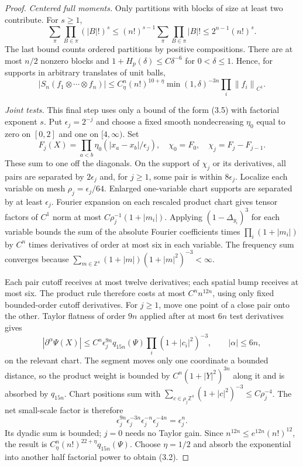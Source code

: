 \documentclass[11pt]{article}
\theoremstyle{remark}
\newcommand{\norm}[1]{\left\|#1\right\|}
\begin{document}
\begin{proof}
\emph{Centered full moments.}
Only partitions with blocks of size at least two contribute. For $s\geq1$,
\[
 \sum_{\pi}\prod_{B\in\pi}(|B|!)^s
 \leq(n!)^{s-1}\sum_{\pi}\prod_{B\in\pi}|B|!
 \leq2^{n-1}(n!)^s.
\]
The last bound counts ordered partitions by positive compositions.
There are at most $n/2$ nonzero blocks and
$1+H_p(\delta)\leq C\delta^{-6}$ for $0<\delta\leq1$.
Hence, for supports in arbitrary translates of unit balls,
\[
 |S_n(f_1\otimes\cdots\otimes f_n)|
 \leq C_\eta^n(n!)^{10+\eta}\min(1,\delta)^{-3n}
                       \prod_i\norm{f_i}_{C^1}.
 \tag{3.5}
\]

\emph{Joint tests.}
This final step uses only a bound of the form (3.5) with factorial
exponent $s$. Put $\epsilon_j=2^{-j}$ and choose a fixed smooth
nondecreasing $\eta_0$ equal to zero on $[0,2]$ and one on $[4,\infty)$.
Set
\[
 F_j(X)=\prod_{a<b}\eta_0(|x_a-x_b|/\epsilon_j),\quad
 \chi_0=F_0,\quad\chi_j=F_j-F_{j-1}.
\]
These sum to one off the diagonals. On the support of $\chi_j$ or its
derivatives, all pairs are separated by $2\epsilon_j$ and, for $j\geq1$,
some pair is within $8\epsilon_j$.
Localize each variable on mesh $\rho_j=\epsilon_j/64$.
Enlarged one-variable chart supports are separated by at least
$\epsilon_j$. Fourier expansion on each rescaled product chart gives
tensor factors of $C^1$ norm at most
$C\rho_j^{-1}(1+|m_i|)$.
Applying $(1-\Delta_{y_i})^3$ for each variable bounds the sum of
the absolute Fourier coefficients times $\prod_i(1+|m_i|)$ by
$C^n$ times derivatives of order at most six in each variable.
The frequency sum converges because
$\sum_{m\in\mathbb Z^4}(1+|m|)(1+|m|^2)^{-3}<\infty$.

Each pair cutoff receives at most twelve derivatives; each spatial
bump receives at most six. The product rule therefore costs at most
$C^n n^{12n}$, using only fixed bounded-order cutoff derivatives.
For $j\geq1$, move one point of a close pair onto the other.
Taylor flatness of order $9n$ applied after at most $6n$ test
derivatives gives
\[
 |\partial^\alpha\Psi(X)|
 \leq C^n\epsilon_j^{9n}q_{15n}(\Psi)
                        \prod_i(1+|c_i|^2)^{-3},
 \qquad |\alpha|\leq6n,
\]
on the relevant chart. The segment moves only one coordinate a bounded
distance, so the product weight is bounded by
$C^n(1+|Y|^2)^{3n}$ along it and is absorbed by $q_{15n}$.
Chart positions sum with
$\sum_{c\in\rho_j\mathbb Z^4}(1+|c|^2)^{-3}\leq C\rho_j^{-4}$.
The net small-scale factor is therefore
\[
 \epsilon_j^{9n}\epsilon_j^{-3n}
 \epsilon_j^{-n}\epsilon_j^{-4n}=\epsilon_j^n.
\]
Its dyadic sum is bounded; $j=0$ needs no Taylor gain. Since
$n^{12n}\leq e^{12n}(n!)^{12}$, the result is
$C_\eta^n(n!)^{22+\eta}q_{15n}(\Psi)$.
Choose $\eta=1/2$ and absorb the exponential into another half factorial
power to obtain (3.2).


\end{proof}
\end{document}
